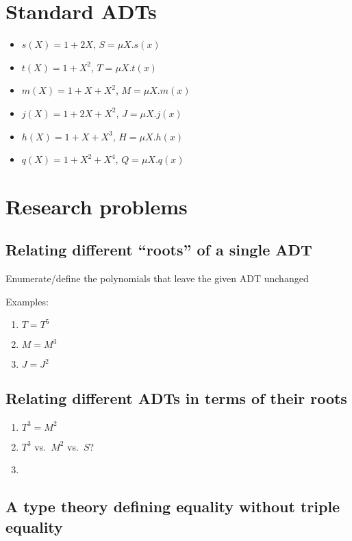 \documentclass[letterpaper,numbers=enddot]{scrartcl}
\begin{document}
\maketitle

\section{Standard ADTs}
\begin{itemize}
  \item $s(X) = 1 + 2X$, $S = \mu X. s(x)$
  \item $t(X) = 1 + X^2$, $T = \mu X. t(x)$
  \item $m(X) = 1 + X + X^2$, $M = \mu X. m(x)$
  \item $j(X) = 1 + 2X + X^2$, $J = \mu X. j(x)$
  \item $h(X) = 1 + X + X^3$, $H = \mu X. h(x)$
  \item $q(X) = 1 + X^2 + X^4$, $Q = \mu X. q(x)$
\end{itemize}

\section{Research problems}
\subsection{Relating different ``roots'' of a single ADT}

Enumerate/define the polynomials that leave the given ADT unchanged

Examples:
\begin{enumerate}
  \item $T = T^5$
  \item $M = M^3$
  \item $J = J^2$
\end{enumerate}

\subsection{Relating different ADTs in terms of their roots}
\begin{enumerate}
  \item $T^3 = M^2$
  \item $T^3$ vs.\ $M^2$ vs.\ $S$?
  \item
\end{enumerate}

\subsection{A type theory defining equality without triple equality}
\end{document}
